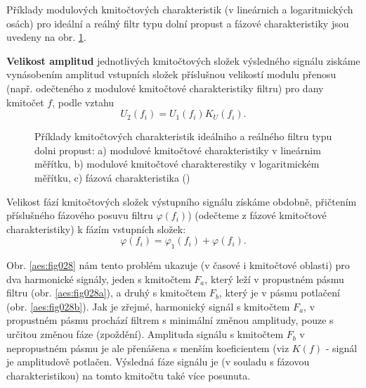       Příklady modulových kmitočtových charakteristik (v lineárnich a logaritmických osách) pro
      ideální a reálný filtr typu dolní propust a fázové charakteristiky jsou uvedeny na obr.
      \ref{aes:fig027}. 
      
      \textbf{Velikost amplitud} jednotlivých kmitočtových složek výsledného signálu ziskáme
      vynásobením amplitud vstupních složek příslušnou velikostí modulu přenosu (např. odečteného
      z modulové kmitočtové charakteristiky filtru) pro dany kmitočet \(f\), podle vztahu
      \begin{equation*}
        U_2(f_i) = U_1(f_i)K_U(f_i).
      \end{equation*} 

      \begin{figure}[ht!]
        \centering  
        \caption{Příklady kmitočtových charakteristik ideálniho a reálného filtru typu dolni
        propust: a) modulové kmitočtové charakteristiky v lineárnim měřítku, b) modulové
                kmitočtové charakterestiky v logaritmickém měřítku, c) fázová charakteristika
                (\cite[s.~27]{HajekSedlacek2002})}
        \label{aes:fig027}
      \end{figure}

      Velikost fází kmitočtových složek výstupního signálu získáme obdobně, přičtením příslušného
      fázového posuvu filtru \(\varphi(f_i)\)) (odečteme z fázové kmitočtové charakteristiky) k
      fázím vstupních složek:
      \begin{equation*}
        \varphi(f_i) = \varphi_1(f_i) + \varphi(f_i).
      \end{equation*} 

      Obr. \ref{aes:fig028} nám tento problém ukazuje (v časové i kmitočtové oblasti) pro dva
      harmonické signály, jeden s kmitočtem \(F_a\), který leží v propustném pásmu filtru (obr.
      \ref{aes:fig028a}), a druhý s kmitočtem \(F_b\), který je v pásmu potlačení (obr.
      \ref{aes:fig028b}). Jak je zřejmé, harmonický signál s kmitočtem \(F_a\), v propustném
      pásmu prochází filtrem s minimální změnou amplitudy, pouze s určitou změnou fáze (zpoždění).
      Amplituda signálu s kmitočtem \(F_b\) v nepropustném pásmu je ale přenášena s menším
      koeficientem (viz \(K(f)\) - signál je amplitudově potlačen. Výsledná fáze signálu je (v
      souladu s fázovou charakteristikou) na tomto kmitočtu také více posunuta.
      
